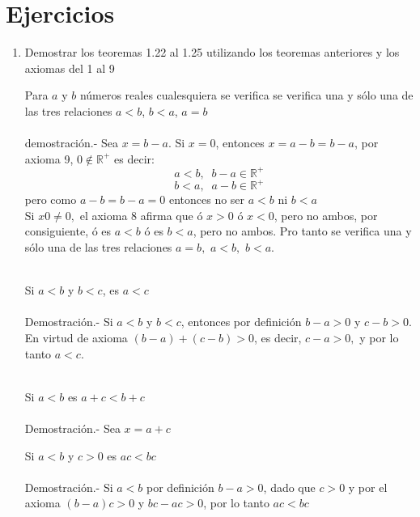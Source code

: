 \section{Ejercicios}
\begin{enumerate}
\item Demostrar los teoremas 1.22 al 1.25 utilizando los teoremas anteriores y los axiomas del 1 al 9
\begin{teo}
Para $a$ y $b$ números reales cualesquiera se verifica se verifica una y sólo una de las tres relaciones $a<b$, $b<a$, $a=b$\\\\
demostración.- \;
Sea $x=b-a$. Si $x=0$, entonces $x=a-b=b-a$, por axioma 9, $0\notin \mathbb{R}^+$ es decir:
$$a<b, \; \; b-a \in \mathbb{R}^+$$
$$b<a, \; \;  a-b \in \mathbb{R}^+$$
pero como $a-b=b-a=0$ entonces no ser $a<b$ ni $b<a$\\
Si $x0\neq 0,$ el axioma 8 afirma que ó $x>0$ ó $ x<0$, pero no ambos, por consiguiente, ó es $a<b$ ó es $b<a$, pero no ambos. Pro tanto se verifica una y sólo una de las tres relaciones $a=b,$ $a<b,$ $b<a$.\\\\
\end{teo}

\begin{teo}
Si $a<b$ y $b<c$, es $a<c$\\\\
Demostración.- \;
Si $a<b$ y $b<c$, entonces por definición $b-a>0$ y $c-b>0$. En virtud de axioma  $(b-a)+(c-b)>0$, es decir, $c-a>0,$ y por lo tanto $a<c$.\\\\
\end{teo}

\begin{teo}
Si $a<b$ es $a+c<b+c$\\\\
Demostración.- \;
Sea $x=a+c$
\end{teo}

\begin{teo}
Si $a<b$ y $c>0$ es $ac<bc$\\\\
Demostración.- \;
Si $a<b$ por definición $b-a>0$, dado que  $c>0$ y por el axioma  $(b-a)c>0$ y $bc-ac>0$, por lo tanto $ac<bc$\\\\
\end{teo}


\end{enumerate}
